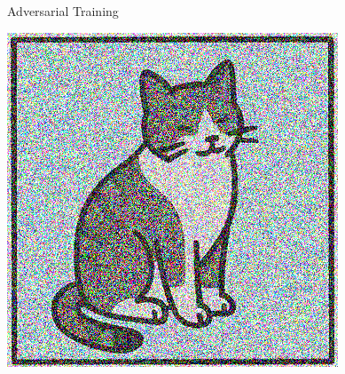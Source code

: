 \begin{frame}{Adversarial Training}
\begin{minipage}{0.15\textwidth}
    \end{minipage}
    \hfill
    \begin{minipage}{0.15\textwidth}
        \includegraphics[width=\textwidth]{assets/input_cat_noise_strong.png}
    \end{minipage}
\end{frame}


